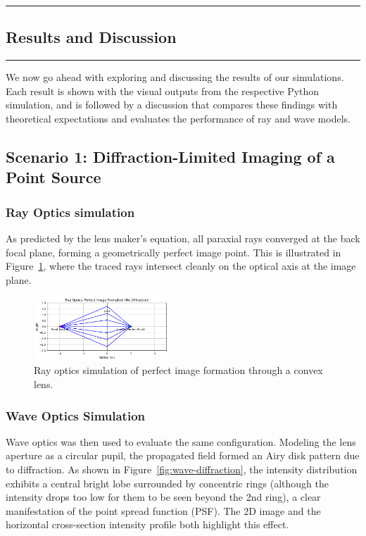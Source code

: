 {\color{gray}\hrule}
\begin{center}
\section{Results and Discussion}
\bigskip
\end{center}
{\color{gray}\hrule}
\begin{multicols}{2}
We now go ahead with exploring and discussing the results of our simulations. Each result is shown with the visual outputs from the respective Python simulation, and is followed
by a discussion that compares these findings with theoretical expectations and evaluates the performance of ray and wave
models.
\subsection{Scenario 1: Diffraction-Limited Imaging of a Point Source}
\subsubsection{Ray Optics simulation}
As predicted by the lens maker's equation, all paraxial rays converged at the back focal plane, forming a geometrically
perfect image point. This is illustrated in Figure~\ref{fig:ray-focus}, where the traced rays intersect cleanly on the
optical axis at the image plane.

\begin{figure}[H]
    \centering
    \includegraphics[width=0.45\textwidth]{../images/ray_optics_perfect_focus.png}
    \caption{Ray optics simulation of perfect image formation through a convex lens.}
    \label{fig:ray-focus}
\end{figure}

\subsubsection{Wave Optics Simulation}
Wave optics was then used to evaluate the same configuration. Modeling the lens aperture as a circular pupil,
the propagated field formed an Airy disk pattern due to diffraction. As shown in Figure~\ref{fig:wave-diffraction},
the intensity distribution exhibits a central bright lobe surrounded by concentric rings (although the intensity drops too low for them to be seen beyond the 2nd ring), a clear manifestation of the point
spread function (PSF). The 2D image and the horizontal cross-section intensity profile both highlight this effect.


\end{multicols}
